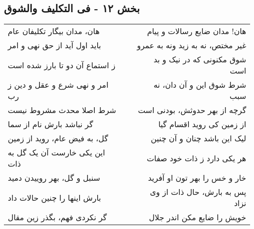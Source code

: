 \begin{center}
\section*{بخش ۱۲ - فی التکلیف والشوق}
\label{sec:012}
\begin{longtable}{l p{0.5cm} r}
هان، مدان بیگار تکلیفان عام
&&
هان! مدان ضایع رسالات و پیام
\\
باید اول آید از حق نهی و امر
&&
غیر مختص، نه به زید ونه به عمرو
\\
ز استماع آن دو تا بارز شده است
&&
شوق مکنونی که در نیک و بد است
\\
امر و نهی شرع و عقل و دین ز رب
&&
شرط شوق این و آن دان، نه سبب
\\
شرط اصلا محدث مشروط نیست
&&
گرچه از بهر حدوثش، بودنی است
\\
گر نباشد بارش نام از سما
&&
از زمین کی روید اقسام گیا
\\
گل، به فیض عام، روید از زمین
&&
لیک این باشد چنان و آن چنین
\\
این یکی خارست آن یک گل به ذات
&&
هر یکی دارد ز ذات خود صفات
\\
سنبل و گل، بهر روییدن دمید
&&
خار و خس را بهر تون او آفرید
\\
بارش اینها را چنین حالات داد
&&
پس به بارش، حال ذات از وی نزاد
\\
گر نکردی فهم، بگذر زین مقال
&&
خویش را ضایع مکن اندر جلال
\\
\end{longtable}
\end{center}

